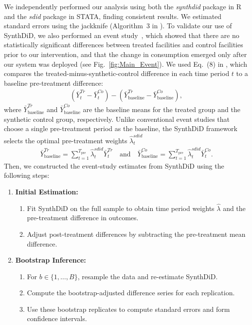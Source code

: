 \documentclass[12pt]{article}
\begin{document}
We independently performed our analysis using both the \textit{synthdid} package in R and the \textit{sdid} package in STATA, finding consistent results. We estimated standard errors using the jackknife (Algorithm~3 in \cite{arkhangelsky2021synthetic}). To validate our use of SynthDiD, we also performed an event study~\cite{clarke2023synthetic}, which showed that there are no statistically significant differences between treated facilities and control facilities prior to our intervention, and that the change in consumption emerged only after our system was deployed (see Fig.~\ref{fig:Main_Event}). We used Eq.~(8) in \cite{clarke2023synthetic}, which compares the treated-minus-synthetic-control difference in each time period $t$ to a baseline pre-treatment difference:
\begin{align*}
(\bar{Y}_t^{Tr} - \bar{Y}_t^{Co}) - (\bar{Y}_{\text{baseline}}^{Tr} - \bar{Y}_{\text{baseline}}^{Co}),
\end{align*}
where $\bar{Y}_{\text{baseline}}^{Tr}$ and $\bar{Y}_{\text{baseline}}^{Co}$ are the baseline means for the treated group and the synthetic control group, respectively. Unlike conventional event studies that choose a single pre-treatment period as the baseline, the SynthDiD framework selects the optimal pre-treatment weights $\hat{\lambda}_t^{sdid}$
\begin{align*}
\bar{Y}_{\text{baseline}}^{Tr} = \sum_{t=1}^{T_{\text{pre}}} \hat{\lambda}_t^{sdid}\bar{Y}_t^{Tr}
\quad \text{and} \quad
\bar{Y}_{\text{baseline}}^{Co} = \sum_{t=1}^{T_{\text{pre}}} \hat{\lambda}_t^{sdid}\bar{Y}_t^{Co}.
\end{align*}
Then, we constructed the event-study estimates from SynthDiD using the following steps:
\begin{enumerate}
\item \textbf{Initial Estimation:}
\begin{enumerate}
\item Fit SynthDiD on the full sample to obtain time period weights $\hat{\lambda}$ and the pre-treatment difference in outcomes.
\item Adjust post-treatment differences by subtracting the pre-treatment mean difference.
\end{enumerate}
\item \textbf{Bootstrap Inference:}
\begin{enumerate}
\item For $b \in\{ 1,\ldots,B\}$, resample the data and re-estimate SynthDiD.
\item Compute the bootstrap-adjusted difference series for each replication.
\item Use these bootstrap replicates to compute standard errors and form confidence intervals.
\end{enumerate}
\end{enumerate}
\end{document}
